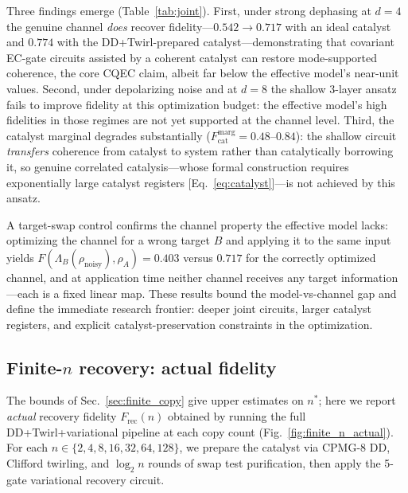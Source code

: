 \documentclass[pra,twocolumn,superscriptaddress,longbibliography,floatfix]{revtex4-2}
\begin{document}
Three findings emerge (Table~\ref{tab:joint}).
First, under strong dephasing at $d = 4$ the genuine channel \emph{does} recover fidelity---$0.542 \to 0.717$ with an ideal catalyst and $0.774$ with the DD+Twirl-prepared catalyst---demonstrating that covariant EC-gate circuits assisted by a coherent catalyst can restore mode-supported coherence, the core CQEC claim, albeit far below the effective model's near-unit values.
Second, under depolarizing noise and at $d = 8$ the shallow 3-layer ansatz fails to improve fidelity at this optimization budget: the effective model's high fidelities in those regimes are not yet supported at the channel level.
Third, the catalyst marginal degrades substantially ($F_\mathrm{cat}^\mathrm{marg} = 0.48$--$0.84$): the shallow circuit \emph{transfers} coherence from catalyst to system rather than catalytically borrowing it, so genuine correlated catalysis---whose formal construction requires exponentially large catalyst registers [Eq.~\eqref{eq:catalyst}]---is not achieved by this ansatz.

A target-swap control confirms the channel property the effective model lacks: optimizing the channel for a wrong target $B$ and applying it to the same input yields $F(\Lambda_B(\rho_\mathrm{noisy}), \rho_A) = 0.403$ versus $0.717$ for the correctly optimized channel, and at application time neither channel receives any target information---each is a fixed linear map.
These results bound the model-vs-channel gap and define the immediate research frontier: deeper joint circuits, larger catalyst registers, and explicit catalyst-preservation constraints in the optimization.


\subsection{Finite-$n$ recovery: actual fidelity}
\label{sec:finite_n_actual}

The bounds of Sec.~\ref{sec:finite_copy} give upper estimates on $n^*$; here we report \emph{actual} recovery fidelity $F_\mathrm{rec}(n)$ obtained by running the full DD+Twirl+variational pipeline at each copy count (Fig.~\ref{fig:finite_n_actual}).
For each $n \in \{2, 4, 8, 16, 32, 64, 128\}$, we prepare the catalyst via CPMG-8 DD, Clifford twirling, and $\log_2 n$ rounds of swap test purification, then apply the 5-gate variational recovery circuit.
\end{document}
